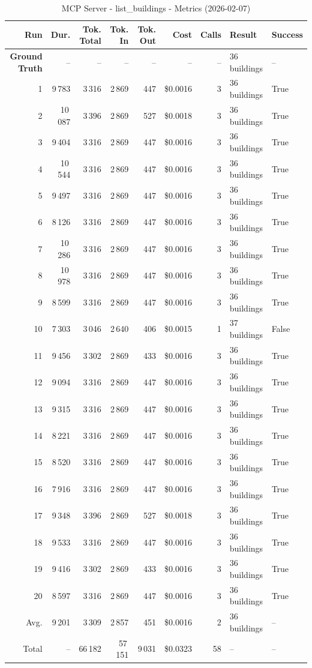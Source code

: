 \documentclass[a4paper,11pt]{article}
\begin{document}
\begin{table}[ht]
\centering
\scriptsize
\caption{MCP Server - list\_buildings - Metrics (2026-02-07)}
\label{tab:mcp\_list\_buildings\_metrics\_2026-02-07}
\begin{tabular}{r r r r r r r p{3cm} l}
\hline
Run & Dur. & Tok. Total & Tok. In & Tok. Out & Cost & Calls & Result & Success \\
\hline
\textbf{Ground Truth} & -- & -- & -- & -- & -- & -- & 36 buildings & -- \\
\hline
1 & 9\,783 & 3\,316 & 2\,869 & 447 & \$0.0016 & 3 & 36 buildings & True \\
2 & 10\,087 & 3\,396 & 2\,869 & 527 & \$0.0018 & 3 & 36 buildings & True \\
3 & 9\,404 & 3\,316 & 2\,869 & 447 & \$0.0016 & 3 & 36 buildings & True \\
4 & 10\,544 & 3\,316 & 2\,869 & 447 & \$0.0016 & 3 & 36 buildings & True \\
5 & 9\,497 & 3\,316 & 2\,869 & 447 & \$0.0016 & 3 & 36 buildings & True \\
6 & 8\,126 & 3\,316 & 2\,869 & 447 & \$0.0016 & 3 & 36 buildings & True \\
7 & 10\,286 & 3\,316 & 2\,869 & 447 & \$0.0016 & 3 & 36 buildings & True \\
8 & 10\,978 & 3\,316 & 2\,869 & 447 & \$0.0016 & 3 & 36 buildings & True \\
9 & 8\,599 & 3\,316 & 2\,869 & 447 & \$0.0016 & 3 & 36 buildings & True \\
10 & 7\,303 & 3\,046 & 2\,640 & 406 & \$0.0015 & 1 & 37 buildings & False \\
11 & 9\,456 & 3\,302 & 2\,869 & 433 & \$0.0016 & 3 & 36 buildings & True \\
12 & 9\,094 & 3\,316 & 2\,869 & 447 & \$0.0016 & 3 & 36 buildings & True \\
13 & 9\,315 & 3\,316 & 2\,869 & 447 & \$0.0016 & 3 & 36 buildings & True \\
14 & 8\,221 & 3\,316 & 2\,869 & 447 & \$0.0016 & 3 & 36 buildings & True \\
15 & 8\,520 & 3\,316 & 2\,869 & 447 & \$0.0016 & 3 & 36 buildings & True \\
16 & 7\,916 & 3\,316 & 2\,869 & 447 & \$0.0016 & 3 & 36 buildings & True \\
17 & 9\,348 & 3\,396 & 2\,869 & 527 & \$0.0018 & 3 & 36 buildings & True \\
18 & 9\,533 & 3\,316 & 2\,869 & 447 & \$0.0016 & 3 & 36 buildings & True \\
19 & 9\,416 & 3\,302 & 2\,869 & 433 & \$0.0016 & 3 & 36 buildings & True \\
20 & 8\,597 & 3\,316 & 2\,869 & 447 & \$0.0016 & 3 & 36 buildings & True \\
\hline
Avg. & 9\,201 & 3\,309 & 2\,857 & 451 & \$0.0016 & 2 & 36 buildings & -- \\
Total & -- & 66\,182 & 57\,151 & 9\,031 & \$0.0323 & 58 & -- & -- \\
\hline
\end{tabular}
\end{table}
\end{document}
